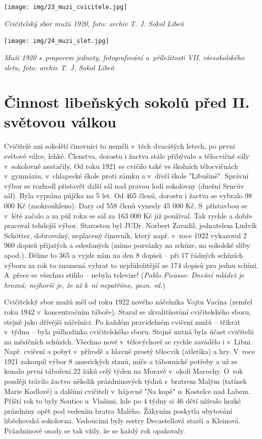 \documentclass[a5paper, 11pt, twoside]{article}
\begin{document}
 \texttt{[image: img/23\_muzi\_cvicitele.jpg]}

\textit{Cvičitelský sbor mužů 1920, foto: archiv T. J. Sokol Libeň}

 \texttt{[image: img/24\_muzi\_slet.jpg]}

\textit{Muži 1920 s~praporem jednoty, fotografování u~příležitosti VII.
všesokolského sletu, foto: archiv T. J. Sokol Libeň}

\section{Činnost libeňských sokolů před II. světovou
válkou}

Cvičitelé ani sokolští činovníci to neměli v~těch dvacátých letech, po
první světové válce, lehké. Členstva, dorostu i žactva stále přibývalo a
tělocvičné sály v~sokolovně nestačily. Od roku 1921 se cvičilo také ve
školních tělocvičnách v~gymnáziu, v~chlapecké škole proti zámku a
v~dívčí škole "Libušině". Správní výbor se rozhodl přistavět další sál
nad pravou lodí sokolovny (dnešní Srncův sál). Byla vypsána půjčka na 5
let. Od 465 členů, dorostu i žactva se vybralo 98 000 Kč (zaokrouhleno).
Dary od 558 členů vynesly 45 000 Kč. S~přístavbou se v~létě začalo a za
půl roku se sál za 163 000 Kč již používal. Tak rychle a dobře pracoval
tehdejší výbor. Starostou byl JUDr. Norbert Zavadil, jednatelem Ludvík
Schötter, dobrovolný, neplacený činovník, který např. v~roce 1922
vykazoval 2 960 dopisů přijatých a odeslaných (mimo pozvánky na schůze,
na sokolské sliby apod.). Dělme to 365 a vyjde nám na den 8 dopisů --
při 17 řádných schůzích výboru za rok to znamená vybrat to
nejdůležitější ze 174 dopisů pro jednu schůzi. A~přece se všechno stihlo
-- nebyla televize! (\textit{Pablo Picasso: Dnešní mládež je hrozná;
nejhorší je, že už k~ní nepatříme, pozn. ed.})

Cvičitelský sbor mužů měl od roku 1922 nového náčelníka Vojtu Vacína
(zemřel roku 1942 v~koncentračním táboře). Staral se zkvalitňování
cvičitelského sboru, stejně jako dřívější náčelníci. Po každém
pravidelném cvičení mužů -- třikrát v~týdnu -- byla půlhodinka
cvičitelského sboru. Stejně nutná byla účast cvičitelů na měsíčních
schůzích. Všechno nové v~tělovýchově se rychle zavádělo i v~Libni. Např.
cvičení a pobyt v~přírodě a hlavně prostý tělocvik (atletika) a hry.
V~roce 1921 zakoupil výbor 8 amerických stanů, míče a tábornické potřeby a
už se konalo první táboření 22 žáků celý týden na Moravě v~okolí
Macochy. O~rok později trávilo žactvo několik prázdninových týdnů
s~bratrem Malým (tatínek Marie Kodlové) a dalšími cvičiteli v~hájovně "Na
kopě" u~Kostelce nad Labem. Příští rok to byly Soutice u~Vlašimi, kde
po 4 týdny si 46 dětí užívalo hezké prázdniny opět pod vedením bratra
Malého. Žákyním poskytla ubytování liběchovská sokolovna. Vedoucími byly
sestry Decastellová starší a Kleinová. Prázdninové osady se tak vžily,
že se každý rok opakovaly.
\end{document}

